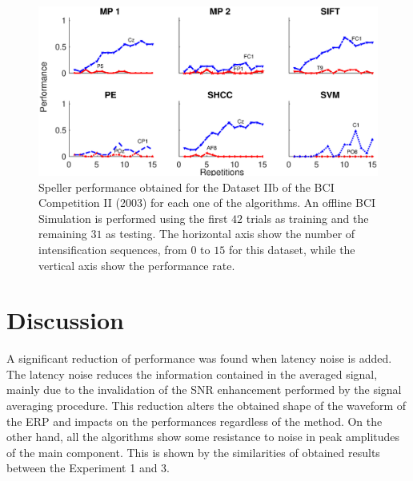 \documentclass[brainsci,article,accept,moreauthors,pdftex,10pt,a4paper]{mdpi}
\begin{document}
 \vspace{-6pt}
\begin{figure}[H]
\centering
\includegraphics[width=16cm]{images/PerformanceBCICompetition.eps}
\caption{Speller performance obtained for the Dataset IIb of the BCI Competition II (2003) for each one of the algorithms.  An offline BCI Simulation is performed using the first $42$ trials as training and the remaining $31$ as testing.  The horizontal axis show the number of intensification sequences, from $0$ to $15$ for this dataset, while the vertical axis show the performance rate.}
\label{fig:performancebcicompetition}
\end{figure}



\section{Discussion}
\label{section:discussion}


A significant reduction of performance was found when latency noise is added.  The latency noise reduces the information contained in the averaged signal, mainly due to the invalidation of the SNR enhancement performed by the signal averaging procedure.  This reduction alters the obtained shape of the waveform of the ERP and impacts on the performances regardless of the method. On the other hand, all the algorithms show some resistance to noise in peak amplitudes of the main component. This is shown by the similarities of obtained results between the Experiment 1 and 3.
\end{document}
